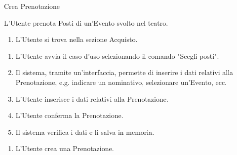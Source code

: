 {\ucTable	%
	{	%
		Crea Prenotazione
		
	}{	%
		
	}{	%
		L'Utente prenota Posti di un'Evento svolto nel teatro.
		
	}{	%
		\attori
	}{	%
		\begin{enumerate}
			\item L'Utente si trova nella sezione Acquisto. %
		\end{enumerate}
		
	}{	%
		\begin{enumerate}
			\item L'Utente avvia il caso d'uso selezionando il comando "Scegli posti".
			\item Il sistema, tramite un'interfaccia, permette di inserire i dati relativi alla Prenotazione, e.g. indicare un nominativo, selezionare un'Evento, ecc.
			\item L'Utente inserisce i dati relativi alla Prenotazione.
			\item L'Utente conferma la Prenotazione.
			\item Il sistema verifica i dati e li salva in memoria.
		\end{enumerate}
		
	}{	%
		\begin{enumerate}
			\item L'Utente crea una Prenotazione.
		\end{enumerate}
		
	}{	%
} }


